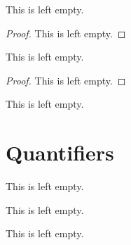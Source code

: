 \begin{proposition}
    This is left empty.
    \begin{proof}
        This is left empty.
    \end{proof}
\end{proposition}

\begin{proposition}
    This is left empty.
    \begin{proof}
        This is left empty.
    \end{proof}
\end{proposition}

\begin{definition}
    This is left empty.
\end{definition}

\section{Quantifiers}
\begin{remark}
    This is left empty.
\end{remark}

\begin{example}
    This is left empty.
\end{example}

\begin{definition}
    This is left empty.
\end{definition}

